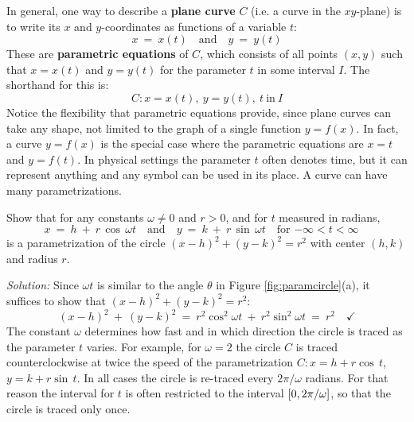 In general, one way to describe a \textbf{plane curve} $C$
(i.e. a curve in the $xy$-plane) is to write its $x$ and $y$-coordinates as
functions of a variable $t$:
\[
x ~=~ x(t) \quad\text{and}\quad y ~=~ y(t)
\]
These are \textbf{parametric equations} of $C$, which consists of all
points $(x,y)$ such that $x=x(t)$ and $y=y(t)$ for the parameter $t$ in some
interval $I$. The shorthand for this is:
\[
C: x=x(t),~y=y(t),~t~\text{in}~I
\]
Notice the flexibility that parametric equations provide, since plane curves
can take any shape, not limited to the graph of a single function $y=f(x)$. In
fact, a curve $y=f(x)$ is the special case where the parametric equations are
$x=t$ and $y=f(t)$. In physical settings the parameter $t$ often denotes time,
but it can represent anything and any symbol can be used in its place. A curve
can have many parametrizations.
\newpage
\begin{exmp}\label{exmp:paramcircle}
\noindent Show that for any constants $\omega \ne 0$ and $r > 0$, and for $t$
measured in radians,
\[
x ~=~ h ~+~ r\,\cos\,\omega t \quad\text{and}\quad
y ~=~ k ~+~ r\,\sin\,\omega t \quad\text{for $-\infty < t < \infty$}\quad
\]
is a parametrization of the circle $(x-h)^2+(y-k)^2=r^2$ with center $(h,k)$ and
radius $r$.\vspace{1mm}
\par\noindent\emph{Solution:} Since $\omega t$ is similar to the angle $\theta$
in Figure \ref{fig:paramcircle}(a), it suffices to show that
$(x-h)^2+(y-k)^2=r^2$:
\[
(x-h)^2 ~+~ (y-k)^2 ~=~ r^2 \cos^2 \omega t ~+~ r^2 \sin^2 \omega t ~=~
 r^2 \quad\checkmark
\]
The constant $\omega$ determines how fast and in which direction the circle is
traced as the parameter $t$ varies. For example, for $\omega=2$ the circle $C$
is traced counterclockwise at twice the speed of the parametrization
$C: x=h+r \cos\,t$, $y=k+r \sin\,t$. In
all cases the circle is re-traced every $2\pi/\omega$ radians. For that reason
the interval for $t$ is often restricted to the interval
$\lbrack 0,2\pi/\omega \rbrack$, so that the circle is traced only once.
\end{exmp}
